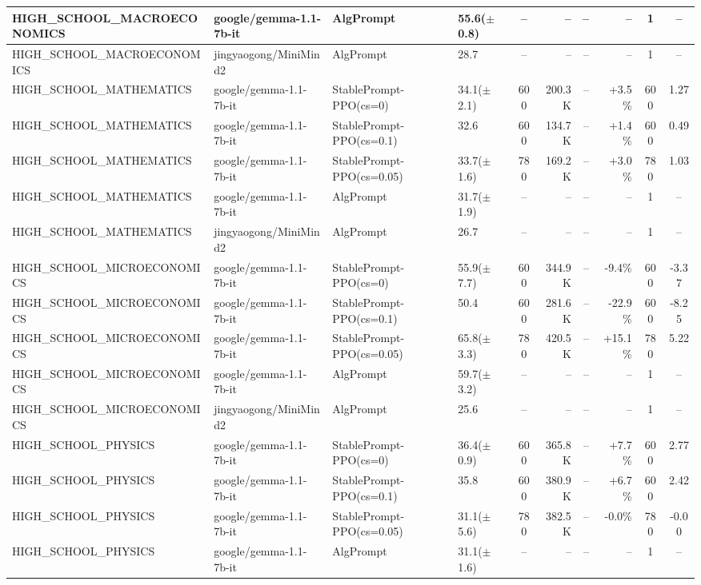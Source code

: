{\begin{longtable}{@{}p{5.5cm}p{4.5cm}p{2.5cm}lcrrrcc@{}}
HIGH\_SCHOOL\_MACROECONOMICS & google/gemma-1.1-7b-it & AlgPrompt & 55.6($\pm$0.8) & -- & -- & -- & -- & 1 & -- \\
\midrule
HIGH\_SCHOOL\_MACROECONOMICS & jingyaogong/MiniMind2 & AlgPrompt & 28.7 & -- & -- & -- & -- & 1 & -- \\
\midrule
HIGH\_SCHOOL\_MATHEMATICS & google/gemma-1.1-7b-it & StablePrompt-PPO(cs=0) & 34.1($\pm$2.1) & 600 & 200.3K & -- & +3.5\% & 600 & 1.27 \\
HIGH\_SCHOOL\_MATHEMATICS & google/gemma-1.1-7b-it & StablePrompt-PPO(cs=0.1) & 32.6 & 600 & 134.7K & -- & +1.4\% & 600 & 0.49 \\
HIGH\_SCHOOL\_MATHEMATICS & google/gemma-1.1-7b-it & StablePrompt-PPO(cs=0.05) & 33.7($\pm$1.6) & 780 & 169.2K & -- & +3.0\% & 780 & 1.03 \\
HIGH\_SCHOOL\_MATHEMATICS & google/gemma-1.1-7b-it & AlgPrompt & 31.7($\pm$1.9) & -- & -- & -- & -- & 1 & -- \\
\midrule
HIGH\_SCHOOL\_MATHEMATICS & jingyaogong/MiniMind2 & AlgPrompt & 26.7 & -- & -- & -- & -- & 1 & -- \\
\midrule
HIGH\_SCHOOL\_MICROECONOMICS & google/gemma-1.1-7b-it & StablePrompt-PPO(cs=0) & 55.9($\pm$7.7) & 600 & 344.9K & -- & -9.4\% & 600 & -3.37 \\
HIGH\_SCHOOL\_MICROECONOMICS & google/gemma-1.1-7b-it & StablePrompt-PPO(cs=0.1) & 50.4 & 600 & 281.6K & -- & -22.9\% & 600 & -8.25 \\
HIGH\_SCHOOL\_MICROECONOMICS & google/gemma-1.1-7b-it & StablePrompt-PPO(cs=0.05) & 65.8($\pm$3.3) & 780 & 420.5K & -- & +15.1\% & 780 & 5.22 \\
HIGH\_SCHOOL\_MICROECONOMICS & google/gemma-1.1-7b-it & AlgPrompt & 59.7($\pm$3.2) & -- & -- & -- & -- & 1 & -- \\
\midrule
HIGH\_SCHOOL\_MICROECONOMICS & jingyaogong/MiniMind2 & AlgPrompt & 25.6 & -- & -- & -- & -- & 1 & -- \\
\midrule
HIGH\_SCHOOL\_PHYSICS & google/gemma-1.1-7b-it & StablePrompt-PPO(cs=0) & 36.4($\pm$0.9) & 600 & 365.8K & -- & +7.7\% & 600 & 2.77 \\
HIGH\_SCHOOL\_PHYSICS & google/gemma-1.1-7b-it & StablePrompt-PPO(cs=0.1) & 35.8 & 600 & 380.9K & -- & +6.7\% & 600 & 2.42 \\
HIGH\_SCHOOL\_PHYSICS & google/gemma-1.1-7b-it & StablePrompt-PPO(cs=0.05) & 31.1($\pm$5.6) & 780 & 382.5K & -- & -0.0\% & 780 & -0.00 \\
HIGH\_SCHOOL\_PHYSICS & google/gemma-1.1-7b-it & AlgPrompt & 31.1($\pm$1.6) & -- & -- & -- & -- & 1 & -- \\

\end{longtable}}
